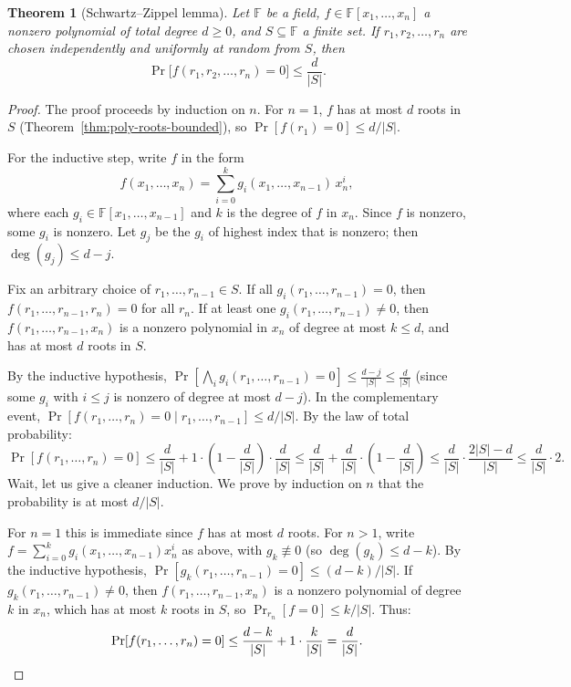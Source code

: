 \documentclass[twoside,12pt]{book}
\theoremstyle{plain}
\newtheorem{theorem}{Theorem}[chapter]
\theoremstyle{definition}
\theoremstyle{remark}
\begin{document}
\begin{theorem}[Schwartz--Zippel lemma]
\label{thm:schwartz-zippel-bis}
Let $\mathbb{F}$ be a field, $f \in \mathbb{F}[x_1, \ldots, x_n]$ a nonzero polynomial of total degree $d \geq 0$, and $S \subseteq \mathbb{F}$ a finite set. If $r_1, r_2, \ldots, r_n$ are chosen independently and uniformly at random from $S$, then
\[
\Pr\bigl[f(r_1, r_2, \ldots, r_n) = 0\bigr] \leq \frac{d}{|S|}.
\]
\end{theorem}

\begin{proof}
The proof proceeds by induction on $n$. For $n = 1$, $f$ has at most $d$ roots in $S$ (Theorem~\ref{thm:poly-roots-bounded}), so $\Pr[f(r_1) = 0] \leq d/|S|$.

For the inductive step, write $f$ in the form
\[
f(x_1, \ldots, x_n) = \sum_{i=0}^{k} g_i(x_1, \ldots, x_{n-1}) \, x_n^i,
\]
where each $g_i \in \mathbb{F}[x_1, \ldots, x_{n-1}]$ and $k$ is the degree of $f$ in $x_n$. Since $f$ is nonzero, some $g_i$ is nonzero. Let $g_j$ be the $g_i$ of highest index that is nonzero; then $\deg(g_j) \leq d - j$.

Fix an arbitrary choice of $r_1, \ldots, r_{n-1} \in S$. If all
$g_i(r_1, \ldots, r_{n-1}) = 0$, then $f(r_1, \ldots, r_{n-1}, r_n) = 0$
for all $r_n$. If at least one $g_i(r_1, \ldots, r_{n-1}) \neq 0$, then
$f(r_1, \ldots, r_{n-1}, x_n)$ is a nonzero polynomial in $x_n$ of degree
at most $k \leq d$, and has at most $d$ roots in $S$.

By the inductive hypothesis,
$\Pr\!\left[\bigwedge_{i} g_i(r_1, \ldots, r_{n-1}) = 0\right] \leq \frac{d - j}{|S|} \leq \frac{d}{|S|}$
(since some $g_i$ with $i \leq j$ is nonzero of degree at most $d - j$).
In the complementary event, $\Pr[f(r_1, \ldots, r_n) = 0 \mid r_1, \ldots,
r_{n-1}] \leq d/|S|$. By the law of total probability:
\[
\Pr[f(r_1, \ldots, r_n) = 0] \leq \frac{d}{|S|} + 1 \cdot \left(1 - \frac{d}{|S|}\right) \cdot \frac{d}{|S|} \leq \frac{d}{|S|} + \frac{d}{|S|} \cdot \left(1 - \frac{d}{|S|}\right) \leq \frac{d}{|S|} \cdot \frac{2|S| - d}{|S|} \leq \frac{d}{|S|} \cdot 2.
\]
Wait, let us give a cleaner induction. We prove by induction on $n$ that the probability is at most $d/|S|$.

For $n=1$ this is immediate since $f$ has at most $d$ roots. For $n > 1$, write $f = \sum_{i=0}^{k} g_i(x_1,\ldots,x_{n-1}) x_n^i$ as above, with $g_k \not\equiv 0$ (so $\deg(g_k) \leq d - k$). By the inductive hypothesis, $\Pr[g_k(r_1,\ldots,r_{n-1}) = 0] \leq (d-k)/|S|$. If $g_k(r_1,\ldots,r_{n-1}) \neq 0$, then $f(r_1,\ldots,r_{n-1}, x_n)$ is a nonzero polynomial of degree $k$ in $x_n$, which has at most $k$ roots in $S$, so $\Pr_{r_n}[f = 0] \leq k/|S|$. Thus:
\[
\Pr[f(r_1,\ldots,r_n) = 0] \leq \frac{d - k}{|S|} + 1 \cdot \frac{k}{|S|} = \frac{d}{|S|}.\qedhere
\]
\end{proof}
\end{document}
